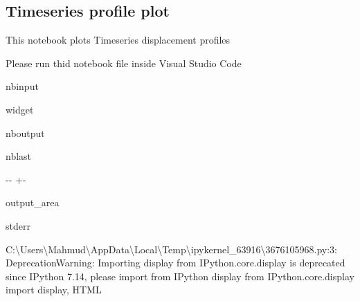 \documentclass[letterpaper,10pt]{sphinxmanual}
\newlength\nbsphinxcodecellspacing
\begin{document}
\sphinxstepscope


\subsection{Time\sphinxhyphen{}series profile plot}
\label{\detokenize{notebooks/akhdefo_ts_plot:Time-series-profile-plot}}\label{\detokenize{notebooks/akhdefo_ts_plot::doc}}
\sphinxAtStartPar
This notebook plots Time\sphinxhyphen{}series displacement profiles

\sphinxAtStartPar
{}

\sphinxAtStartPar
Please run thid notebook file inside Visual Studio Code

\begin{sphinxuseclass}{nbinput}
{
\begin{sphinxVerbatim}[commandchars=\\\{\}]
\llap{\color{nbsphinxin}[1]:\,\hspace{\fboxrule}\hspace{\fboxsep}} widget
    
    

\end{sphinxVerbatim}
}

\end{sphinxuseclass}
\begin{sphinxuseclass}{nboutput}
\begin{sphinxuseclass}{nblast}
{

\kern-\sphinxverbatimsmallskipamount\kern-\baselineskip
\kern+\FrameHeightAdjust\kern-\fboxrule
\vspace{\nbsphinxcodecellspacing}

\begin{sphinxuseclass}{output_area}
\begin{sphinxuseclass}{stderr}


\begin{sphinxVerbatim}[commandchars=\\\{\}]
C:\textbackslash{}Users\textbackslash{}Mahmud\textbackslash{}AppData\textbackslash{}Local\textbackslash{}Temp\textbackslash{}ipykernel\_63916\textbackslash{}3676105968.py:3: DeprecationWarning: Importing display from IPython.core.display is deprecated since IPython 7.14, please import from IPython display
  from IPython.core.display import display, HTML
\end{sphinxVerbatim}



\end{sphinxuseclass}
\end{sphinxuseclass}
}

\end{sphinxuseclass}
\end{sphinxuseclass}
\end{document}

